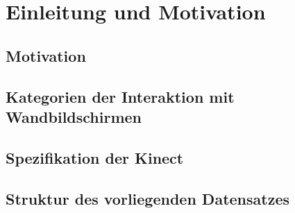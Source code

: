 \chapter{Einleitung und Motivation}
\label{chapter1}


\section{Motivation}
\label{chapter1-Motivation}


\section{Kategorien der Interaktion mit Wandbildschirmen}
\label{chapter1-KategorienInteraktion-Wandbildschirme}


\section{Spezifikation der Kinect}
\label{chapter1-SpezifikationKinect}


\section{Struktur des vorliegenden Datensatzes}
\label{chapter1-StrukturDatensatz}

\cite{}